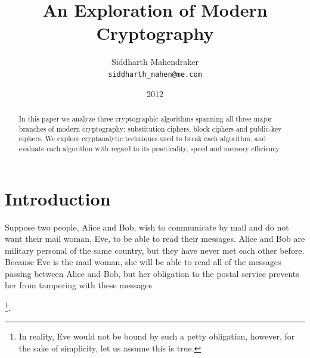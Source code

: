 \documentclass[12pt, a4paper, final]{report}
\begin{document}
\title{An Exploration of Modern Cryptography}
\author{Siddharth Mahendraker\\
        \texttt{siddharth\_mahen@me.com}}
\date{2012}
\maketitle

\begin{abstract}
In this paper we analyze three cryptographic algorithms spanning
all three major branches of modern cryptography: substitution ciphers,
block ciphers and public-key ciphers. We explore cryptanalytic techniques used
to break each algorithm, and evaluate each algorithm with regard to its
practicality, speed and memory efficiency.
\end{abstract}

\setcounter{secnumdepth}{3}
\renewcommand{\thesection}{\arabic{section}}
\renewcommand{\cftsecfont}{\bfseries}
\setlength\cftbeforesecskip{3pt}
\setlength\cftbeforesubsecskip{3pt}

\newcommand{\ptm}[2]{\Pr\begin{pmatrix}
\text{\scriptsize#1}\\
\text{\scriptsize#2}
\end{pmatrix}}

\newcommand{\fnt}[1]{%
\addtocounter{fn}{1}%
\footnote[\value{fn}]{#1}}

\setcounter{page}{1}
\tableofcontents
\clearpage
{}
\setcounter{page}{1}

\section*{Introduction}

Suppose two people, Alice and Bob, wish to communicate by mail and do not
want their mail woman, Eve, to be able to read their messages. Alice and Bob
are military personal of the same country, but they have never met each
other before. Because Eve is the mail woman, she will be able to read
all of the messages passing between Alice and Bob, but her obligation to
the postal service prevents her from tampering with these
messages\fnt{In reality, Eve would not be bound by such a petty
obligation, however, for the sake of simplicity, let us assume this is
true.}.
\end{document}
